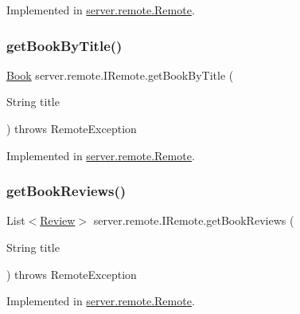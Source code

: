 Implemented in \hyperlink{classserver_1_1remote_1_1_remote_a36ffc6f95ea75ad7d393ea296e1bc0cc}{server.\+remote.\+Remote}.

\mbox{\label{interfaceserver_1_1remote_1_1_i_remote_a520cc1af90d13264c14b32e19b5ce712}} 
\subsubsection{\texorpdfstring{get\+Book\+By\+Title()}{getBookByTitle()}}
{\footnotesize\ttfamily \hyperlink{classserver_1_1data_1_1_book}{Book} server.\+remote.\+I\+Remote.\+get\+Book\+By\+Title (\begin{DoxyParamCaption}\item[{String}]{title }\end{DoxyParamCaption}) throws Remote\+Exception}



Implemented in \hyperlink{classserver_1_1remote_1_1_remote_a560427fc017e15f04e12bd880e6f086e}{server.\+remote.\+Remote}.

\mbox{\label{interfaceserver_1_1remote_1_1_i_remote_a600254593b70d9757190475d3435b390}} 
\subsubsection{\texorpdfstring{get\+Book\+Reviews()}{getBookReviews()}}
{\footnotesize\ttfamily List$<$\hyperlink{classserver_1_1data_1_1_review}{Review}$>$ server.\+remote.\+I\+Remote.\+get\+Book\+Reviews (\begin{DoxyParamCaption}\item[{String}]{title }\end{DoxyParamCaption}) throws Remote\+Exception}



Implemented in \hyperlink{classserver_1_1remote_1_1_remote_a501e5c5fe847917c9615f0772864a147}{server.\+remote.\+Remote}.

